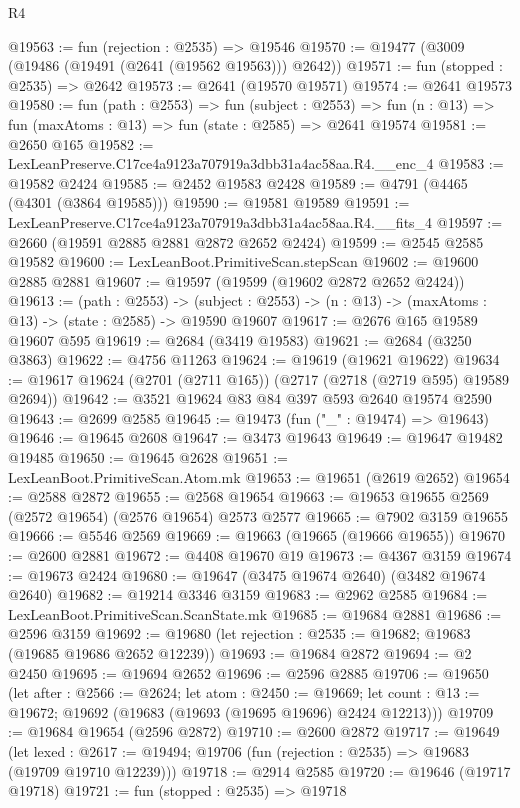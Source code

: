 \begin{lexlean}{R4}
\begin{coremodule}
@19563 := fun (rejection : @2535) => @19546
@19570 := @19477 (@3009 (@19486 (@19491 (@2641 (@19562 @19563))) @2642))
@19571 := fun (stopped : @2535) => @2642
@19573 := @2641 (@19570 @19571)
@19574 := @2641 @19573
@19580 := fun (path : @2553) =>
  fun (subject : @2553) =>
  fun (n : @13) => fun (maxAtoms : @13) => fun (state : @2585) => @2641 @19574
@19581 := @2650 @165
@19582 := LexLeanPreserve.C17ce4a9123a707919a3dbb31a4ac58aa.R4.__enc_4
@19583 := @19582 @2424
@19585 := @2452 @19583 @2428
@19589 := @4791 (@4465 (@4301 (@3864 @19585)))
@19590 := @19581 @19589
@19591 := LexLeanPreserve.C17ce4a9123a707919a3dbb31a4ac58aa.R4.__fits_4
@19597 := @2660 (@19591 @2885 @2881 @2872 @2652 @2424)
@19599 := @2545 @2585 @19582
@19600 := LexLeanBoot.PrimitiveScan.stepScan
@19602 := @19600 @2885 @2881
@19607 := @19597 (@19599 (@19602 @2872 @2652 @2424))
@19613 := (path : @2553) ->
  (subject : @2553) -> (n : @13) -> (maxAtoms : @13) -> (state : @2585) -> @19590 @19607
@19617 := @2676 @165 @19589 @19607 @595
@19619 := @2684 (@3419 @19583)
@19621 := @2684 (@3250 @3863)
@19622 := @4756 @11263
@19624 := @19619 (@19621 @19622)
@19634 := @19617 @19624 (@2701 (@2711 @165)) (@2717 (@2718 (@2719 @595) @19589 @2694))
@19642 := @3521 @19624 @83 @84 @397 @593 @2640 @19574 @2590
@19643 := @2699 @2585
@19645 := @19473 (fun ("_" : @19474) => @19643)
@19646 := @19645 @2608
@19647 := @3473 @19643
@19649 := @19647 @19482 @19485
@19650 := @19645 @2628
@19651 := LexLeanBoot.PrimitiveScan.Atom.mk
@19653 := @19651 (@2619 @2652)
@19654 := @2588 @2872
@19655 := @2568 @19654
@19663 := @19653 @19655 @2569 (@2572 @19654) (@2576 @19654) @2573 @2577
@19665 := @7902 @3159 @19655
@19666 := @5546 @2569
@19669 := @19663 (@19665 (@19666 @19655))
@19670 := @2600 @2881
@19672 := @4408 @19670 @19
@19673 := @4367 @3159
@19674 := @19673 @2424
@19680 := @19647 (@3475 @19674 @2640) (@3482 @19674 @2640)
@19682 := @19214 @3346 @3159
@19683 := @2962 @2585
@19684 := LexLeanBoot.PrimitiveScan.ScanState.mk
@19685 := @19684 @2881
@19686 := @2596 @3159
@19692 := @19680 (let rejection : @2535 := @19682; @19683 (@19685 @19686 @2652 @12239))
@19693 := @19684 @2872
@19694 := @2 @2450
@19695 := @19694 @2652
@19696 := @2596 @2885
@19706 := @19650
    (let after : @2566 := @2624;
    let atom : @2450 := @19669;
    let count : @13 := @19672; @19692 (@19683 (@19693 (@19695 @19696) @2424 @12213)))
@19709 := @19684 @19654 (@2596 @2872)
@19710 := @2600 @2872
@19717 := @19649
    (let lexed : @2617 := @19494; @19706 (fun (rejection : @2535) => @19683 (@19709 @19710 @12239)))
@19718 := @2914 @2585
@19720 := @19646 (@19717 @19718)
@19721 := fun (stopped : @2535) => @19718

\end{coremodule}
\end{lexlean}
